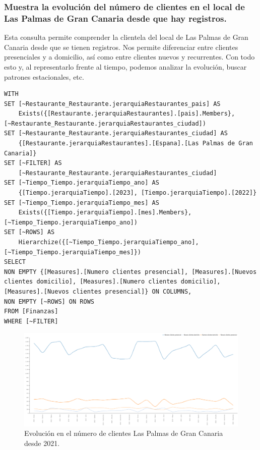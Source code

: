 \documentclass[11pt]{opticajnl}
\begin{document}
\subsubsection{Muestra la evolución del número de clientes en el local de Las Palmas de Gran Canaria desde que hay registros.}

Esta consulta permite comprender la clientela del local de Las Palmas de Gran Canaria desde que se tienen registros. Nos permite diferenciar entre clientes presenciales y a domicilio, así como entre clientes nuevos y recurrentes. Con todo esto y, al representarlo frente al tiempo, podemos analizar la evolución, buscar patrones estacionales, etc.

\begin{lstlisting}[style=terminal]
WITH
SET [~Restaurante_Restaurante.jerarquiaRestaurantes_pais] AS
    Exists({[Restaurante.jerarquiaRestaurantes].[pais].Members}, [~Restaurante_Restaurante.jerarquiaRestaurantes_ciudad])
SET [~Restaurante_Restaurante.jerarquiaRestaurantes_ciudad] AS
    {[Restaurante.jerarquiaRestaurantes].[Espana].[Las Palmas de Gran Canaria]}
SET [~FILTER] AS
    [~Restaurante_Restaurante.jerarquiaRestaurantes_ciudad]
SET [~Tiempo_Tiempo.jerarquiaTiempo_ano] AS
    {[Tiempo.jerarquiaTiempo].[2023], [Tiempo.jerarquiaTiempo].[2022]}
SET [~Tiempo_Tiempo.jerarquiaTiempo_mes] AS
    Exists({[Tiempo.jerarquiaTiempo].[mes].Members}, [~Tiempo_Tiempo.jerarquiaTiempo_ano])
SET [~ROWS] AS
    Hierarchize({[~Tiempo_Tiempo.jerarquiaTiempo_ano], [~Tiempo_Tiempo.jerarquiaTiempo_mes]})
SELECT
NON EMPTY {[Measures].[Numero clientes presencial], [Measures].[Nuevos clientes domicilio], [Measures].[Numero clientes domicilio], [Measures].[Nuevos clientes presencial]} ON COLUMNS,
NON EMPTY [~ROWS] ON ROWS
FROM [Finanzas]
WHERE [~FILTER]
\end{lstlisting}

\begin{figure}[H]
    \centering
    \includegraphics[width=\textwidth]{fotos/clientesLasPalmas.png}
    \caption{Evolución en el número de clientes Las Palmas de Gran Canaria desde 2021.}
    \label{fig:consulta3}
\end{figure}
\end{document}
